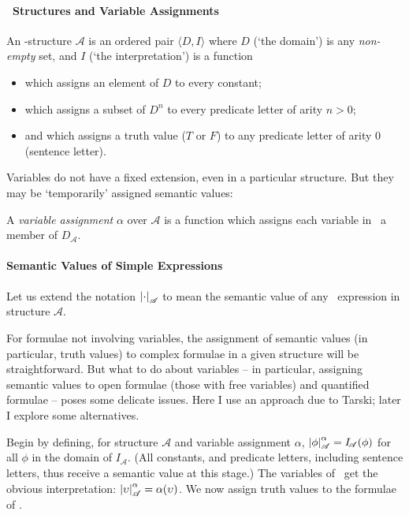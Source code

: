 \paragraph{\ltwo\ Structures and Variable Assignments}

\begin{definition}
	An \ltwo-structure $\mathscr{A}$ is an ordered pair $\langle D, I\rangle$ where $D$ (`the domain') is any \emph{non-empty} set, and $I$ (`the interpretation') is a function \begin{itemize}
		\item which assigns an element of $D$ to every constant;
		\item which assigns a subset of $D^{n}$ to every predicate letter of arity $n>0$;
		\item and which assigns a truth value ($T$ or $F$) to any predicate letter of arity $0$ (sentence letter).
	\end{itemize}
\end{definition} Variables do not have a fixed extension, even in a particular structure. But they may be `temporarily' assigned semantic values: \begin{definition} A \emph{variable assignment} $\alpha$ over $\mathscr{A}$ is a function which assigns each variable in \ltwo\ a member of $D_{\!\mathscr{A}}$.
	\end{definition}

\paragraph{Semantic Values of Simple Expressions}

Let us extend the notation $\left|\cdot\right|_{\mathscr{A}}$ to mean the semantic value of any \ltwo\ expression in structure $\mathscr{A}$. 

For formulae not involving variables, the assignment of semantic values (in particular, truth values) to complex formulae in a given structure will be straightforward. But what to do about variables – in particular, assigning semantic values to open formulae (those with free variables) and quantified formulae – poses some delicate issues. Here I use an approach due to Tarski;  later  I explore some alternatives.

Begin by defining, for structure $\mathscr{A}$ and variable assignment $\alpha$, $\left|\phi\right|^{\alpha}_{\mathscr{A}}=I_{\!\mathscr{A}}(\phi)$ for all $\phi$ in the domain of $I_{\!\mathscr{A}}$. (All constants, and predicate letters, including sentence letters, thus receive a semantic value at this stage.) The variables of \ltwo\ get the obvious interpretation: $\left|\upsilon\right|^{\alpha}_{\mathscr{A}}=\alpha(\upsilon)$.
We now assign truth values to the formulae of \ltwo.

